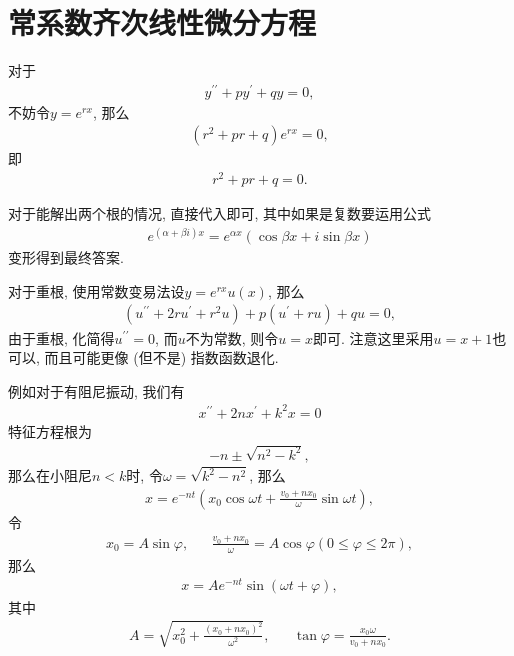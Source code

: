 \documentclass[UTF8,a4paper,11pt]{ctexart}
\begin{document}
  \section{常系数齐次线性微分方程}
    对于
    \[
    \begin{aligned}
      y^{\prime\prime}+py^{\prime}+qy=0,
    \end{aligned}
    \]
    不妨令$y=e^{rx}$,
    那么
    \[
    \begin{aligned}
      \left(r^{2}+p r+q\right)e^{rx}=0,
    \end{aligned}
    \]
    即
    \[
    \begin{aligned}
      r^{2}+p r+q=0.
    \end{aligned}
    \]
    
    对于能解出两个根的情况, 直接代入即可,
    其中如果是复数要运用公式
    \[
    \begin{aligned}
      e^{\left(\alpha+\beta i\right)x}=e^{\alpha x}\left(\cos \beta x+i \sin \beta x\right)
    \end{aligned}
    \]
    变形得到最终答案.

    对于重根, 使用常数变易法设$y=e^{rx}u\left(x\right)$,
    那么
    \[
    \begin{aligned}
      \left(u^{\prime\prime}+2ru^{\prime}+r^{2}u\right)+p\left(u^{\prime}+ru\right)+qu=0,
    \end{aligned}
    \]
    由于重根, 化简得$u^{\prime\prime}=0$, 而$u$不为常数,
    则令$u=x$即可. 注意这里采用$u=x+1$也可以, 而且可能更像 (但不是) 指数函数退化.

    例如对于有阻尼振动, 我们有
    \[
    \begin{aligned}
      x^{\prime\prime}+2nx^{\prime}+k^{2}x=0
    \end{aligned}
    \]
    特征方程根为
    \[
    \begin{aligned}
      -n \pm \sqrt{n^{2}-k^{2}},
    \end{aligned}
    \]
    那么在小阻尼$n<k$时, 令$\omega=\sqrt{k^{2}-n^{2}}$, 那么
    \[
    \begin{aligned}
      x=e^{-nt}\left(x_0 \cos \omega t + \frac{v_0+nx_0}{\omega}\sin \omega t\right),
    \end{aligned}
    \]
    令
    \[
    \begin{aligned}
      x_0=A \sin \varphi, &&
      \frac{v_0+nx_0}{\omega}=A \cos \varphi \left(0\le \varphi \le 2\pi\right),
    \end{aligned}
    \]
    那么
    \[
    \begin{aligned}
      x=Ae^{-nt}\sin\left(\omega t+\varphi\right),
    \end{aligned}
    \]
    其中
    \[
    \begin{aligned}
      A=\sqrt{x_0^{2}+\frac{\left(x_0+nx_0\right)^{2}}{\omega^{2}}},&&
      \tan \varphi = \frac{x_0\omega}{v_0+nx_0}.
    \end{aligned}
    \]
\end{document}

